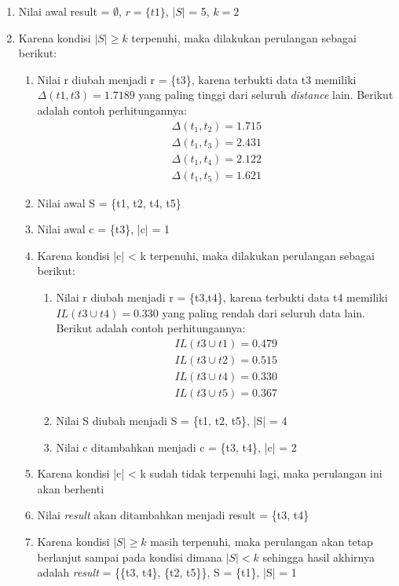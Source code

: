 \begin{enumerate}
\item Nilai awal result = $\emptyset$, $r = \{t1\}$, $|S|$ = 5, $k = 2$
\item Karena kondisi $|S| \geq k$ terpenuhi, maka dilakukan perulangan sebagai berikut:
\begin{enumerate}
\item Nilai r diubah menjadi r = \{t3\}, karena terbukti data t3 memiliki $\Delta(t1,t3)=1.7189$ yang paling tinggi dari seluruh \textit{distance} lain. Berikut adalah contoh perhitungannya:
\begin{align*}
\Delta (t_1,t_2) = 1.715\\
\Delta (t_1,t_3) = 2.431\\
\Delta (t_1,t_4) = 2.122\\
\Delta (t_1,t_5) = 1.621 
\end{align*}
\item Nilai awal S = \{t1, t2, t4, t5\}
\item Nilai awal c = \{t3\}, |c| = 1
\item Karena kondisi |c| < k terpenuhi, maka dilakukan perulangan sebagai berikut:

\begin{enumerate}
\item Nilai r diubah menjadi r = \{t3,t4\}, karena terbukti data t4 memiliki $IL(t3 \cup t4)=0.330$ yang paling rendah dari seluruh data lain. Berikut adalah contoh perhitungannya:
\begin{align*}
IL(t3 \cup t1) = 0.479 \\
IL(t3 \cup t2) = 0.515 \\
IL(t3 \cup t4) = 0.330 \\
IL(t3 \cup t5) = 0.367 
\end{align*}
\item Nilai S diubah menjadi S = \{t1, t2, t5\}, |S| = 4
\item Nilai c ditambahkan menjadi c = \{t3, t4\}, |c| = 2

\end{enumerate}
\item Karena kondisi |c| < k sudah tidak terpenuhi lagi, maka perulangan ini akan berhenti
\item Nilai \textit{result} akan ditambahkan menjadi result = \{t3, t4\}
\item Karena kondisi $|S| \geq k$ masih terpenuhi, maka perulangan akan tetap berlanjut sampai pada kondisi dimana $|S| < k$ sehingga hasil akhirnya adalah \textit{result} = \{\{t3, t4\}, \{t2, t5\}\}, S = \{t1\}, |S| = 1


\end{enumerate}
\end{enumerate}
